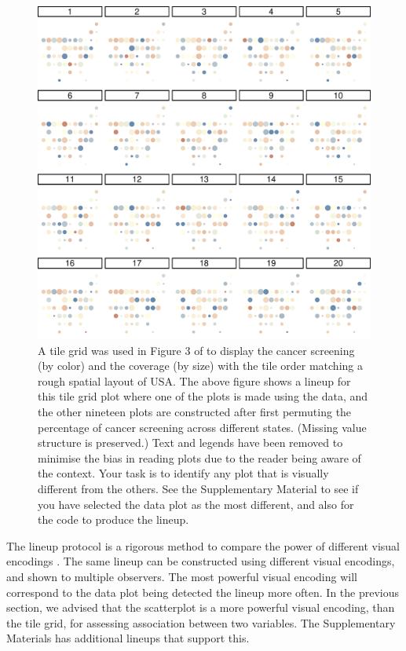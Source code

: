 \documentclass[ijds,nonblindrev]{informs-ijds}
\begin{document}
\begin{figure}[h!]
    \centering
    \includegraphics[width = \textwidth]{lineup-theirs-1.pdf}
    \caption{A tile grid was used in Figure 3 of \citet{basole2021} to display the cancer screening (by color) and the coverage (by size) with the tile order matching a rough spatial layout of USA. The above figure shows a lineup for this tile grid plot where one of the plots is made using the data, and the other nineteen plots are constructed after first permuting the percentage of cancer screening across different states. (Missing value structure is preserved.) Text and legends have been removed to minimise the bias in reading plots due to the reader being aware of the context. Your task is to identify any plot that is visually different from the others. See the Supplementary Material to see if you have selected the data plot as the most different, and also for the code to produce the lineup.}
    \label{fig:fig3-lineup}
\end{figure}

The lineup protocol is a rigorous method to compare the power of different visual encodings \citep[see examples in][]{hofmann2012graphical}. The same lineup can be constructed using different visual encodings, and shown to multiple observers. The most powerful visual encoding will correspond to the data plot being detected the lineup more often. In the previous section, we advised that the scatterplot is a more powerful visual encoding, than the tile grid, for assessing association between two variables.  The Supplementary Materials has additional lineups that support this.
\end{document}
